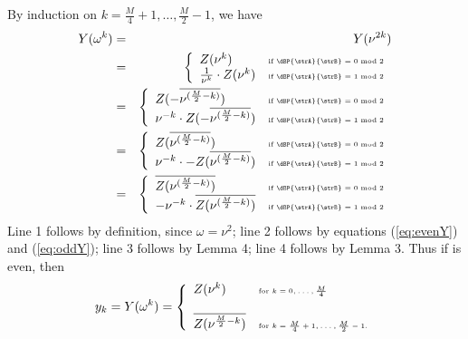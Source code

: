 By induction on $k=\frac{M}{4}+1,\ldots,\frac{M}{2}-1$, we have
\begin{eqnarray*}
Y(\omega^k)&=& Y(\nu^{2k})  \nonumber \\
&=& \left\{ \begin{array}{ll}
Z(\nu^{k}) &\mbox{\tiny if
$\dBP{\strA}{\strB} = 0 \bmod 2$}\\
\frac{1}{\nu^{k}} \cdot Z(\nu^{k})
&\mbox{\tiny if
$\dBP{\strA}{\strB} = 1 \bmod 2$}\\
\end{array} \right. \nonumber\\
&=& \left\{ \begin{array}{ll}
Z(- \overline{\nu^{(\frac{M}{2}-k)}}) &\mbox{\tiny if
$\dBP{\strA}{\strB} = 0 \bmod 2$}\\
\nu^{-k} \cdot
Z(-\overline{\nu^{(\frac{M}{2}-k)}})
&\mbox{\tiny if
$\dBP{\strA}{\strB} = 1 \bmod 2$}\\
\end{array} \right. \nonumber\\
&=& \left\{ \begin{array}{ll}
Z(\overline{\nu^{(\frac{M}{2}-k)}}) &\mbox{\tiny if
$\dBP{\strA}{\strB} = 0 \bmod 2$}\\
\nu^{-k} \cdot
-Z(\overline{\nu^{(\frac{M}{2}-k)}})
&\mbox{\tiny if
$\dBP{\strA}{\strB} = 1 \bmod 2$}\\
\end{array} \right.  \nonumber\\
&=& \left\{ \begin{array}{ll}
\overline{Z(\nu^{(\frac{M}{2}-k)})} &\mbox{\tiny if
$\dBP{\strA}{\strB} = 0 \bmod 2$}\\
-\nu^{-k} \cdot
\overline{Z(\nu^{(\frac{M}{2}-k)})}
&\mbox{\tiny if
$\dBP{\strA}{\strB} = 1 \bmod 2$}\\
\end{array} \right.  \nonumber\\
\end{eqnarray*}
Line 1 follows by definition, since $\omega=\nu^2$;
line 2 follows by equations (\ref{eq:evenY}) and
(\ref{eq:oddY});
line 3 follows by Lemma 4;
line 4 follows by Lemma 3.
Thus if \dBP{\strA}{\strB} is even, then
\begin{eqnarray}
\label{eq:trickyRootsOfUnity1}
y_k = Y(\omega^k) = \left\{
\begin{array}{ll}
Z(\nu^k) &\mbox{\tiny for $k=0,\ldots,\frac{M}{4}$}\\
\quad & \quad\\
\overline{Z(\nu^{\frac{M}{2}-k})} &\mbox{\tiny for $k=\frac{M}{4}+1,\ldots,\frac{M}{2}-1$.}\\
\end{array} \right.
\end{eqnarray}

